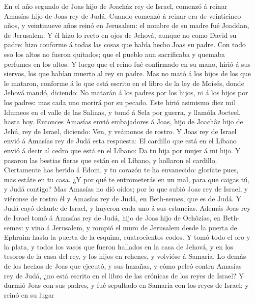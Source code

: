  En el año segundo de Joas hijo de Joachâz rey de Israel,
comenzó á reinar Amasías hijo de Joas rey de Judá.  Cuando
comenzó á reinar era de veinticinco años, y veintinueve años reinó en
Jerusalem: el nombre de su madre fué Joaddan, de Jerusalem.
 Y él hizo lo recto en ojos de Jehová, aunque no como
David su padre: hizo conforme á todas las cosas que había hecho Joas su
padre.  Con todo eso los altos no fueron quitados; que el
pueblo aun sacrificaba y quemaba perfumes en los altos.  Y
luego que el reino fué confirmado en su mano, hirió á sus siervos, los
que habían muerto al rey su padre.  Mas no mató á los
hijos de los que le mataron, conforme á lo que está escrito en el libro
de la ley de Moisés, donde Jehová mandó, diciendo: No matarán á los
padres por los hijos, ni á los hijos por los padres: mas cada uno morirá
por su pecado.  Este hirió asimismo diez mil Idumeos en el
valle de las Salinas, y tomó á Sela por guerra, y llamóla Jocteel, hasta
hoy.  Entonces Amasías envió embajadores á Joas, hijo de
Joachâz hijo de Jehú, rey de Israel, diciendo: Ven, y veámonos de
rostro.  Y Joas rey de Israel envió á Amasías rey de Judá
esta respuesta: El cardillo que está en el Líbano envió á decir al cedro
que está en el Líbano: Da tu hija por mujer á mi hijo. Y pasaron las
bestias fieras que están en el Líbano, y hollaron el cardillo.
 Ciertamente has herido á Edom, y tu corazón te ha
envanecido: gloríate pues, mas estáte en tu casa. ¿Y por qué te
entrometerás en un mal, para que caigas tú, y Judá contigo?
 Mas Amasías no dió oídos; por lo que subió Joas rey de
Israel, y viéronse de rostro él y Amasías rey de Judá, en Beth-semes,
que es de Judá.  Y Judá cayó delante de Israel, y huyeron
cada uno á sus estancias.  Además Joas rey de Israel tomó
á Amasías rey de Judá, hijo de Joas hijo de Ochôzías, en Beth-semes: y
vino á Jerusalem, y rompió el muro de Jerusalem desde la puerta de
Ephraim hasta la puerta de la esquina, cuatrocientos codos.
 Y tomó todo el oro y la plata, y todos los vasos que
fueron hallados en la casa de Jehová, y en los tesoros de la casa del
rey, y los hijos en rehenes, y volvióse á Samaria.  Lo
demás de los hechos de Joas que ejecutó, y sus hazañas, y cómo peleó
contra Amasías rey de Judá, ¿no está escrito en el libro de las crónicas
de los reyes de Israel?  Y durmió Joas con sus padres, y
fué sepultado en Samaria con los reyes de Israel; y reinó en su lugar

